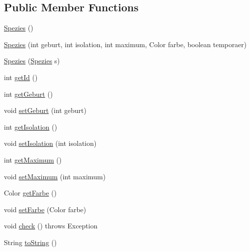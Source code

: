\subsection*{Public Member Functions}
\begin{DoxyCompactItemize}
\item 
\hyperlink{classde_1_1gameoflife_1_1models_1_1Spezies_abccc305894da9c49235b4f5734b30264}{Spezies} ()
\item 
\hyperlink{classde_1_1gameoflife_1_1models_1_1Spezies_a4427057aab04605df38440a9b5385d6a}{Spezies} (int geburt, int isolation, int maximum, Color farbe, boolean temporaer)
\item 
\hyperlink{classde_1_1gameoflife_1_1models_1_1Spezies_a0ecc254db7aab2c8bf8aa748f3f98595}{Spezies} (\hyperlink{classde_1_1gameoflife_1_1models_1_1Spezies}{Spezies} s)
\item 
int \hyperlink{classde_1_1gameoflife_1_1models_1_1Spezies_a1f75c5740891cfe16f4488bdf5aba660}{get\-Id} ()
\item 
int \hyperlink{classde_1_1gameoflife_1_1models_1_1Spezies_a785118f5e8bb910366620cf91e076ff1}{get\-Geburt} ()
\item 
void \hyperlink{classde_1_1gameoflife_1_1models_1_1Spezies_afa81e4c0114a12a0d161ae053eac8f5c}{set\-Geburt} (int geburt)
\item 
int \hyperlink{classde_1_1gameoflife_1_1models_1_1Spezies_a5832063ef1552fd12b52640cf621ac38}{get\-Isolation} ()
\item 
void \hyperlink{classde_1_1gameoflife_1_1models_1_1Spezies_aab2584eab95e5af05730d1801cb9bbd6}{set\-Isolation} (int isolation)
\item 
int \hyperlink{classde_1_1gameoflife_1_1models_1_1Spezies_a4c88e513cbed18a5c48453ff428f7901}{get\-Maximum} ()
\item 
void \hyperlink{classde_1_1gameoflife_1_1models_1_1Spezies_a0510f76f89df83febe2f6ea2aa8da833}{set\-Maximum} (int maximum)
\item 
Color \hyperlink{classde_1_1gameoflife_1_1models_1_1Spezies_ab124735141bf4925cad1e0a2bc1a3254}{get\-Farbe} ()
\item 
void \hyperlink{classde_1_1gameoflife_1_1models_1_1Spezies_ad20b651f1ffab0d980c03bd8c9ace480}{set\-Farbe} (Color farbe)
\item 
void \hyperlink{classde_1_1gameoflife_1_1models_1_1Spezies_a56527f529ca4530152574d084724efeb}{check} ()  throws Exception 	
\item 
String \hyperlink{classde_1_1gameoflife_1_1models_1_1Spezies_a0cc05c1bf8b843555a4bb272b2a0470a}{to\-String} ()
\end{DoxyCompactItemize}
